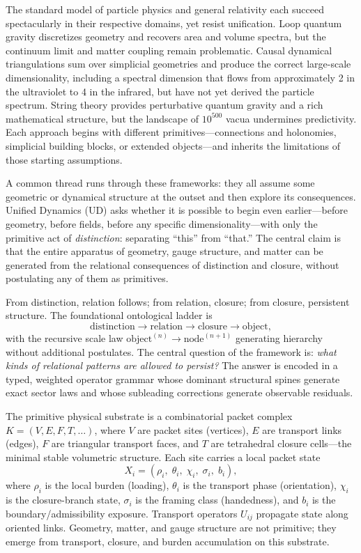 \documentclass[11pt,twocolumn]{article}
\begin{document}
The standard model of particle physics and general relativity each succeed spectacularly in their respective domains, yet resist unification.
Loop quantum gravity\cite{cdt} discretizes geometry and recovers area and volume spectra, but the continuum limit and matter coupling remain problematic.
Causal dynamical triangulations sum over simplicial geometries and produce the correct large-scale dimensionality, including a spectral dimension that flows from approximately 2 in the ultraviolet to 4 in the infrared,\cite{cdt} but have not yet derived the particle spectrum.
String theory provides perturbative quantum gravity and a rich mathematical structure, but the landscape of $10^{500}$ vacua undermines predictivity.
Each approach begins with different primitives---connections and holonomies, simplicial building blocks, or extended objects---and inherits the limitations of those starting assumptions.

A common thread runs through these frameworks: they all assume some geometric or dynamical structure at the outset and then explore its consequences.
Unified Dynamics (UD) asks whether it is possible to begin even earlier---before geometry, before fields, before any specific dimensionality---with only the primitive act of \emph{distinction}: separating ``this'' from ``that.''
The central claim is that the entire apparatus of geometry, gauge structure, and matter can be generated from the relational consequences of distinction and closure, without postulating any of them as primitives.

From distinction, relation follows; from relation, closure; from closure, persistent structure.
The foundational ontological ladder is
\begin{equation}
\label{eq:ladder}
\text{distinction} \to \text{relation} \to \text{closure} \to \text{object},
\end{equation}
with the recursive scale law $\text{object}^{(n)} \to \text{node}^{(n+1)}$ generating hierarchy without additional postulates.
The central question of the framework is: \emph{what kinds of relational patterns are allowed to persist?}
The answer is encoded in a typed, weighted operator grammar whose dominant structural spines generate exact sector laws and whose subleading corrections generate observable residuals.

The primitive physical substrate is a combinatorial packet complex $K = (V, E, F, T, \ldots)$, where $V$ are packet sites (vertices), $E$ are transport links (edges), $F$ are triangular transport faces, and $T$ are tetrahedral closure cells---the minimal stable volumetric structure.
Each site carries a local packet state
\begin{equation}
\label{eq:packet-state}
X_i = (\rho_i,\; \theta_i,\; \chi_i,\; \sigma_i,\; b_i),
\end{equation}
where $\rho_i$ is the local burden (loading), $\theta_i$ is the transport phase (orientation), $\chi_i$ is the closure-branch state, $\sigma_i$ is the framing class (handedness), and $b_i$ is the boundary/admissibility exposure.
Transport operators $U_{ij}$ propagate state along oriented links.
Geometry, matter, and gauge structure are not primitive; they emerge from transport, closure, and burden accumulation on this substrate.
\end{document}

